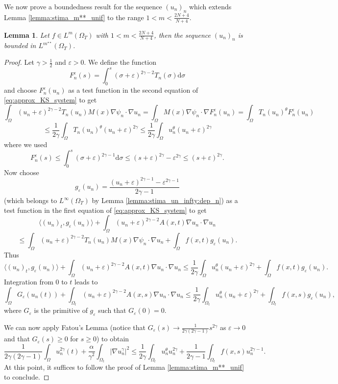 \documentclass{amsart}
\numberwithin{equation}{section}
\newtheorem{lemma}[example]{Lemma}
\def\elle#1{L^{#1}}
\def\elleomT#1{L^{#1}(\Omega_T)}
\def\io{\int_\Omega}
\def\iot{\int_{\Omega_t}}
\newcommand{\abs}[1]{\left|#1\right|}
\begin{document}
We now prove a boundedness result for the sequence $(u_n)_n$ which extends Lemma \ref{lemma:stima_m**_unif} to the range $1<m<\frac{2N+4}{N+4}$.
\begin{lemma}\label{lemma:stima_m**_unif:infinite_energy}
    Let $f\in\elle m (\Omega_T)$ with $1<m<\frac{2N+4}{N+4}$, then the sequence $(u_n)_n$ is bounded in $\elleomT {m^{\star\star}}$.
\end{lemma}
\begin{proof}
    Let $\gamma>\frac{1}{2}$ and $\varepsilon>0$. We define the function
    $$F_n^\varepsilon(s)=\int_0^s (\sigma+\varepsilon)^{2\gamma-2}T_n(\sigma) \mathrm{d}\sigma$$
    and choose $F_n^\varepsilon(u_n)$ as a test function in the second equation of \eqref{eq:approx_KS_system} to get
    $$
    \io (u_n+\varepsilon)^{2\gamma-2}T_n(u_n) M(x)\nabla \psi_n\cdot\nabla u_n 
    =
    \io M(x)\nabla \psi_n\cdot\nabla F_n^\varepsilon(u_n)
    =
    \io T_n(u_n)^\theta F_n^\varepsilon(u_n)
    $$
    $$
    \leq \frac{1}{2\gamma}\io T_n(u_n)^\theta (u_n+\varepsilon)^{2\gamma}
    \leq
    \frac{1}{2\gamma}\io u_n^{\theta} (u_n+\varepsilon)^{2\gamma}
    $$
    where we used 
    $$F_n^\varepsilon(s)\leq \int_0^s (\sigma+\varepsilon)^{2\gamma-1}\mathrm{d}\sigma\leq (s+\varepsilon)^{2\gamma}-\varepsilon^{2\gamma}\leq (s+\varepsilon)^{2\gamma}.$$
    Now choose 
    $$g_\varepsilon(u_n)=\frac{(u_n+\varepsilon)^{2\gamma-1}-\varepsilon^{2\gamma-1}}{2\gamma-1}$$
    (which belongs to $\elleomT\infty$ by Lemma \ref{lemma:stima_un_infty:dep_n}) as a test function in the first equation of \eqref{eq:approx_KS_system} to get
    $$\langle (u_n)_t,g_\varepsilon(u_n)\rangle
    +\io(u_n+\varepsilon)^{2\gamma-2}A(x,t)\nabla u_n \cdot \nabla u_n$$
    $$
    \leq\io (u_n+\varepsilon)^{2\gamma-2}T_n(u_n) M(x)\nabla \psi_n\cdot\nabla u_n 
    +\io f(x,t)g_\varepsilon(u_n).$$
    Thus
    $$\langle (u_n)_t,g_\varepsilon(u_n)\rangle
    +\io(u_n+\varepsilon)^{2\gamma-2}A(x,t)\nabla u_n \cdot \nabla u_n
    \leq
    \frac{1}{2\gamma}\io u_n^{\theta} (u_n+\varepsilon)^{2\gamma}+\io f(x,t)g_\varepsilon(u_n).$$
    Integration from $0$ to $t$ leads to
    $$
    \io G_\varepsilon(u_n(t)) + \iot (u_n+\varepsilon)^{2\gamma-2}A(x,s)\nabla u_n \cdot \nabla u_n
    \leq
    \frac{1}{2\gamma}\iot u_n^{\theta} (u_n+\varepsilon)^{2\gamma}+\iot f(x,s)g_\varepsilon(u_n),
    $$
    where $G_\varepsilon$ is the primitive of $g_\varepsilon$ such that $G_\varepsilon(0)=0$.
    
    We can now apply Fatou's Lemma (notice that $G_\varepsilon(s)\to \frac{1}{2\gamma(2\gamma-1)}s^{2\gamma}$ as $\varepsilon\to0$ and that $G_\varepsilon(s)\geq 0$ for $s\geq 0$) to obtain
    $$\frac{1}{{2\gamma(2\gamma-1)}}\io u_n^{2\gamma}(t)
    +\frac{\alpha}{\gamma^2}\iot\abs{\nabla u_n^\gamma}^2
    \leq
    \frac{1}{2\gamma}\iot u_n^\theta u_n^{2\gamma}+\frac{1}{2\gamma-1}\iot f(x,s)u_n^{2\gamma-1}.$$
    At this point, it suffices to follow the proof of Lemma \ref{lemma:stima_m**_unif} to conclude.
\end{proof}
\end{document}
